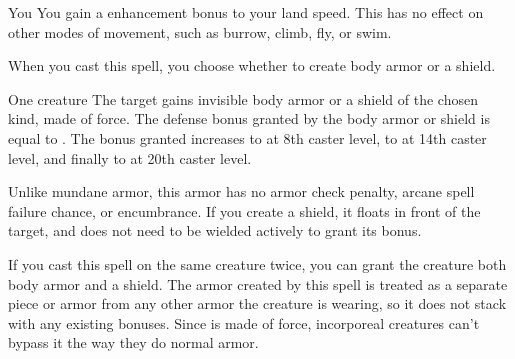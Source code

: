 \begin{spellheader}
    \spelldur{\durlong \dismissable}
\end{spellheader}
\begin{spelleffects}
    \begin{spelltarget}{You}
        \spelleffect You gain a  enhancement bonus to your land speed. This has no effect on other modes of movement, such as burrow, climb, fly, or swim.
    \end{spelltarget}
\end{spelleffects}
\begin{spellfooter}
    
\end{spellfooter}

\begin{comment}
\subsubsection{M}
\end{comment}

\begin{spellheader}
    \spellrng{\rngclose}
    \spellspecial When you cast this spell, you choose whether to create body armor or a shield.
\end{spellheader}
\begin{spelleffects}
    \begin{spelltarget}{One creature}
        \spelleffect The target gains invisible body armor or a shield of the chosen kind, made of force. The defense bonus granted by the body armor or shield is equal to . The bonus granted increases to  at 8th caster level, to  at 14th caster level, and finally to  at 20th caster level. 
        \par Unlike mundane armor, this armor has no armor check penalty, arcane spell failure chance, or encumbrance. If you create a shield, it floats in front of the target, and does not need to be wielded actively to grant its bonus.
        \spellspecial 
    \end{spelltarget}
\end{spelleffects}
\begin{spellfooter}
    \spellnotes If you cast this spell on the same creature twice, you can grant the creature both body armor and a shield. The armor created by this spell is treated as a separate piece or armor from any other armor the creature is wearing, so it does not stack with any existing bonuses. Since  is made of force, incorporeal creatures can't bypass it the way they do normal armor.
\end{spellfooter}

